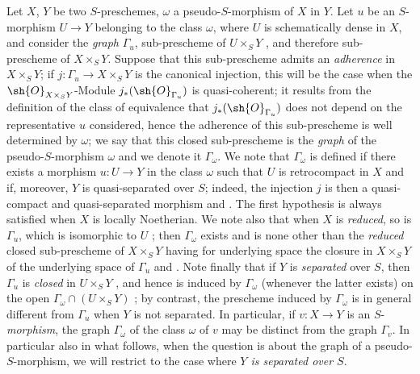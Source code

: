 \begin{env}[20.4.1]
\label{IV.20.4.1}
Let $X$, $Y$ be two $S$-preschemes, $\omega$ a pseudo-$S$-morphism of $X$ in $Y$.
Let $u$ be an $S$-morphism $U\to Y$ belonging to the class $\omega$, where $U$ is schematically dense in $X$, and consider the \emph{graph} $\Gamma_u$, sub-prescheme of $U\times_S Y$ , and therefore sub-prescheme of $X\times_S Y$.
Suppose that this sub-prescheme admits an \emph{adherence}  in $X\times_S Y$;
if $j:\Gamma_u\to X\times_S Y$ is the canonical injection, this will be the case when the $\sh{O}_{X\times_S Y}$-Module $j_*(\sh{O}_{\Gamma_u})$ is quasi-coherent;
it results from the definition of the class of equivalence  that $j_*(\sh{O}_{\Gamma_u})$ does not depend on the representative $u$ considered, hence the adherence of this sub-prescheme is well determined by $\omega$;
we say that this closed sub-prescheme is the \emph{graph} of the pseudo-$S$-morphism $\omega$ and we denote it $\Gamma_\omega$.
We note that $\Gamma_\omega$ is defined if there exists a morphism $u:U\to Y$ in the class $\omega$ such that $U$ is retrocompact in $X$ and if, moreover, $Y$ is quasi-separated over $S$;
indeed, the injection $j$ is then a quasi-compact and quasi-separated morphism  and .
The first hypothesis is always satisfied when $X$ is locally Noetherian.
We note also that when $X$ is \emph{reduced}, so is $\Gamma_u$, which is isomorphic to $U$ ;
then $\Gamma_\omega$ exists and is none other than the \emph{reduced} closed sub-prescheme of $X\times_S Y$ having for underlying space the closure in $X\times_S Y$ of the underlying space of $\Gamma_u$  and .
Note finally that if $Y$ is \emph{separated} over $S$, then $\Gamma_u$ is \emph{closed} in $U\times_S Y$ , and hence is induced by $\Gamma_\omega$ (whenever the latter exists) on the open $\Gamma_\omega\cap(U\times_S Y)$ ;
by contrast, the prescheme induced by $\Gamma_\omega$ is in general different from $\Gamma_u$ when $Y$ is not separated.
In particular, if $v:X\to Y$ is an $S$-\emph{morphism}, the graph $\Gamma_\omega$ of the class $\omega$ of $v$ may be distinct from the graph $\Gamma_v$.
In particular also in what follows, when the question is about the graph of a pseudo-$S$-morphism, we will restrict to the case where \emph{$Y$ is separated over $S$}.
\end{env}

